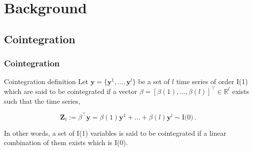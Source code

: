 \documentclass[compress,red]{beamer}
\begin{document}
\section{Background}
%
%

\subsection{Cointegration}
\begin{frame}
\frametitle{Cointegration}
\begin{block}{Cointegration definition}
Let $\mathbf{y} = \{\mathbf{y}^1, \dots, \mathbf{y}^l\}$ be a set of $l$
time series of order I(1) which are said to be cointegrated if a vector
$\beta=[\beta(1),\dots,\beta(l)]^\top \in \mathbb{R}^l$  exists such that the
time series,

\begin{equation*}
 \mathbf{Z}_t:= \beta^\top \mathbf{y} = \beta(1) \mathbf{y}^1 + \dots + \beta(l) \mathbf{y}^l \sim
 \text{I(0)}\, .
\end{equation*}
\end{block}
In other words, a set of I(1) variables is said to be cointegrated if
a linear combination of them exists which is I(0).

\end{frame}
\end{document}

